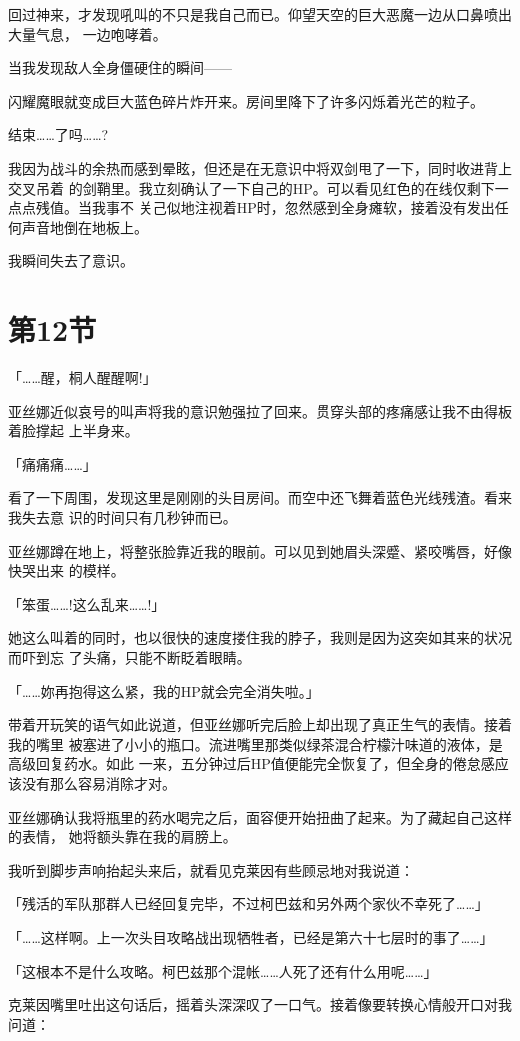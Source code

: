 \documentclass[11pt]{book}
\begin{document}
回过神来，才发现吼叫的不只是我自己而已。仰望天空的巨大恶魔一边从口鼻喷出大量气息，
一边咆哮着。

当我发现敌人全身僵硬住的瞬间——

闪耀魔眼就变成巨大蓝色碎片炸开来。房间里降下了许多闪烁着光芒的粒子。

结束……了吗……?

我因为战斗的余热而感到晕眩，但还是在无意识中将双剑甩了一下，同时收进背上交叉吊着
的剑鞘里。我立刻确认了一下自己的HP。可以看见红色的在线仅剩下一点点残值。当我事不
关己似地注视着HP时，忽然感到全身瘫软，接着没有发出任何声音地倒在地板上。

我瞬间失去了意识。
\section{第12节}
\label{sec:orgca4726d}
「……醒，桐人醒醒啊!」

亚丝娜近似哀号的叫声将我的意识勉强拉了回来。贯穿头部的疼痛感让我不由得板着脸撑起
上半身来。

「痛痛痛……」

看了一下周围，发现这里是刚刚的头目房间。而空中还飞舞着蓝色光线残渣。看来我失去意
识的时间只有几秒钟而已。

亚丝娜蹲在地上，将整张脸靠近我的眼前。可以见到她眉头深蹙、紧咬嘴唇，好像快哭出来
的模样。

「笨蛋……!这么乱来……!」

她这么叫着的同时，也以很快的速度搂住我的脖子，我则是因为这突如其来的状况而吓到忘
了头痛，只能不断眨着眼睛。

「……妳再抱得这么紧，我的HP就会完全消失啦。」

带着开玩笑的语气如此说道，但亚丝娜听完后脸上却出现了真正生气的表情。接着我的嘴里
被塞进了小小的瓶口。流进嘴里那类似绿茶混合柠檬汁味道的液体，是高级回复药水。如此
一来，五分钟过后HP值便能完全恢复了，但全身的倦怠感应该没有那么容易消除才对。

亚丝娜确认我将瓶里的药水喝完之后，面容便开始扭曲了起来。为了藏起自己这样的表情，
她将额头靠在我的肩膀上。

我听到脚步声响抬起头来后，就看见克莱因有些顾忌地对我说道：

「残活的军队那群人已经回复完毕，不过柯巴兹和另外两个家伙不幸死了……」

「……这样啊。上一次头目攻略战出现牺牲者，已经是第六十七层时的事了……」

「这根本不是什么攻略。柯巴兹那个混帐……人死了还有什么用呢……」

克莱因嘴里吐出这句话后，摇着头深深叹了一口气。接着像要转换心情般开口对我问道：
\end{document}
